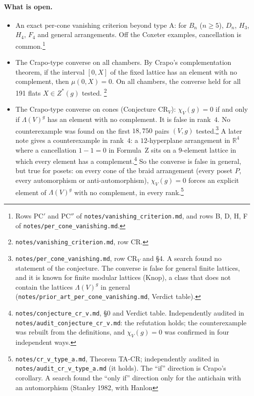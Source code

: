 \documentclass[11pt]{article}
\theoremstyle{definition}
\theoremstyle{remark}
\newcommand{\src}[1]{\nolinkurl{#1}}
\newcommand{\tagbox}[1]{\leavevmode\marginpar{\raggedright\fbox{\parbox{0.66in}{\centering\scriptsize\sffamily #1}}}}
\newcommand{\CONJ}{\tagbox{CONJEC-\\TURED}}
\newcommand{\OPEN}{\tagbox{OPEN}}
\newcommand{\REFUTED}{\tagbox{REFUTED\\AUDITED}}
\begin{document}
\paragraph{What is open.}
\begin{itemize}
\item \OPEN An exact per-cone vanishing criterion beyond type A: for $B_n$
  ($n\ge5$), $D_n$, $H_3$, $H_4$, $F_4$ and general arrangements. Off the
  Coxeter examples, cancellation is common.\footnote{Rows PC$'$ and PC$''$ of
  \src{notes/vanishing_criterion.md}, and rows B, D, H, F of
  \src{notes/per_cone_vanishing.md}.}
\item \CONJ The Crapo-type converse on all chambers. By Crapo's
  complementation theorem, if the
  interval $[0,X]$ of the fixed lattice has an element with no complement,
  then $\mu(0,X)=0$. On all chambers, the converse held for all 191 flats
  $X\in Z^*(g)$ tested.%
  \footnote{\src{notes/vanishing_criterion.md}, row CR.}
\item \REFUTED The Crapo-type converse on cones (Conjecture CR$_V$):
  $\chi_V(g)=0$ if and only if $\Lambda(V)^g$ has an element
  with no complement. It is false in rank~$4$. No counterexample was found
  on the first $18{,}750$ pairs $(V,g)$ tested.\footnote{\src{notes/per_cone_vanishing.md}, row
  CR$_V$ and \S4. A search found no statement of the conjecture. The
  converse is false for general finite lattices, and it is known for finite
  modular lattices (Knop), a class that does not contain the lattices
  $\Lambda(V)^g$ in general (\src{notes/prior_art_per_cone_vanishing.md},
  Verdict table).} A later note gives a counterexample in rank~$4$: a
  $12$-hyperplane arrangement in $\mathbb R^4$ where a cancellation $1-1=0$
  in Formula~Z sits on a $9$-element lattice in which every element has a
  complement.\footnote{%
  \src{notes/conjecture_cr_v.md}, \S0 and Verdict table. Independently
  audited in \src{notes/audit_conjecture_cr_v.md}: the refutation holds;
  the counterexample was rebuilt from the definitions, and $\chi_V(g)=0$ was
  confirmed in four independent ways.}
  So the converse is false in general, but true for posets: on every cone
  of the braid arrangement (every poset $P$, every automorphism or
  anti-automorphism), $\chi_V(g)=0$ forces an explicit element of
  $\Lambda(V)^g$ with no complement, in every rank.\footnote{%
  \src{notes/cr_v_type_a.md}, Theorem TA-CR; independently audited in
  \src{notes/audit_cr_v_type_a.md} (it holds). The ``if'' direction is
  Crapo's corollary. A search found the ``only if'' direction
  only for the antichain with an automorphism (Stanley 1982, with Hanlon
}
\end{itemize}
\end{document}
